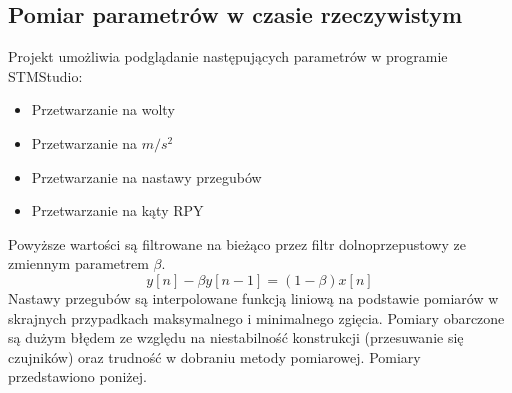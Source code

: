 \documentclass[12pt,a4paper]{article}
\begin{document}
\subsection{Pomiar parametrów w czasie rzeczywistym}
Projekt umożliwia podglądanie następujących parametrów w programie STMStudio:
\begin{itemize}
\item Przetwarzanie na wolty
\item Przetwarzanie na $m/s^2$
\item Przetwarzanie na nastawy przegubów
\item Przetwarzanie na kąty RPY
\end{itemize}
Powyższe wartości są filtrowane na bieżąco przez filtr dolnoprzepustowy ze zmiennym parametrem $\beta$.
\begin{equation}
y[n] - \beta y[n-1] = (1-\beta)x[n]
\end{equation}
Nastawy przegubów są interpolowane funkcją liniową na podstawie pomiarów w skrajnych przypadkach maksymalnego i minimalnego zgięcia. Pomiary obarczone są dużym błędem ze względu na niestabilność konstrukcji (przesuwanie się czujników) oraz trudność w dobraniu metody pomiarowej. Pomiary przedstawiono poniżej.
\end{document}

